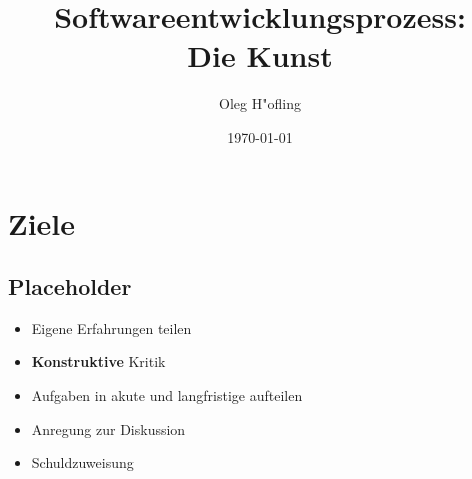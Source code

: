 \documentclass{beamer}
\newcommand{\cmark}{\ding{51}}
\newcommand{\xmark}{\ding{55}}
\begin{document}
\title[Die Kunst]{Softwareentwicklungsprozess: \\ Die Kunst}
\date{\today}
\author{Oleg H"ofling}
\frame{\maketitle}


\section{Ziele}
\subsection{Placeholder}
\begin{frame}
	\begin{itemize}[<+->]
		\item[\cmark] Eigene Erfahrungen teilen
		\item[\cmark] \textbf{Konstruktive} Kritik
		\item[\cmark] Aufgaben in akute und langfristige aufteilen
		\item[\cmark] Anregung zur Diskussion
		\item[\xmark] Schuldzuweisung
	\end{itemize}
\end{frame}
\end{document}
